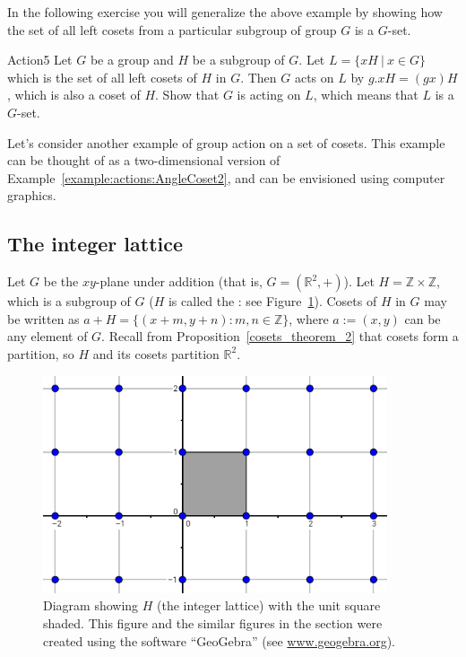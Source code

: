 In the following exercise you will generalize the above example by showing how the set of all left cosets from a particular subgroup of group $G$ is a $G$-set.

\begin{exercise}{Action5}
Let $G$ be a group and $H$ be a subgroup of $G$. Let $L=\{xH~|~x\in G \}$ which is the set of all left cosets of $H$ in $G$. Then $G$ acts on $L$ by $g.xH = (gx)H$, which is also a coset of $H$. Show that $G$ is acting on $L$, which means that $L$ is a $G$-set.
\end{exercise}

Let's consider another example of group action on a set of cosets.  This example can be thought of as a two-dimensional version of Example~\ref{example:actions:AngleCoset2}, and can be envisioned using computer graphics.

\subsection{The integer lattice}\label{subsec:lattice}

Let $G$ be the $xy$-plane under addition (that is, $G=(\mathbb {R}^2,+)$).  Let $H=\mathbb{Z}\times \mathbb{Z}$, which is a subgroup of $G$ ($H$ is called the : see Figure~\ref{fig:HwithUnitSquare}).
Cosets of $H$ in $G$ may be written as $a+H=\{(x+m, y+n):m,n \in\mathbb{ Z}\}$, where $a :=(x,y)$ can be any element of $G$. Recall from Proposition~\ref{cosets_theorem_2} that cosets form a partition, so $H$ and its cosets partition $\mathbb{R}^2$.

\begin{figure}[htpb]
\begin{center}
\includegraphics[width=4in]{images/Lattice_Hwithunitsquare.png}
\caption{\label{fig:HwithUnitSquare}Diagram showing $H$ (the integer lattice) with the unit square shaded. This figure and the similar figures in the section were created using the software ``GeoGebra'' (see \url{www.geogebra.org}).  }
\end{center}
\end{figure}

